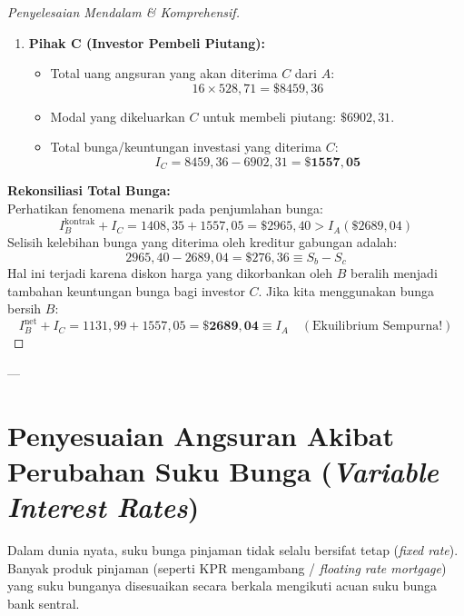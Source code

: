 \documentclass[11pt,a4paper]{article}
\begin{document}
\begin{proof}[Penyelesaian Mendalam \& Komprehensif]
\begin{enumerate}[label=\textbf{\arabic*.}]
    \item \textbf{Pihak C (Investor Pembeli Piutang):}
    \begin{itemize}
        \item Total uang angsuran yang akan diterima $C$ dari $A$:
        \begin{equation*}
            16 \times 528{,}71 = \$8459{,}36
        \end{equation*}
        \item Modal yang dikeluarkan $C$ untuk membeli piutang: $\$6902{,}31$.
        \item Total bunga/keuntungan investasi yang diterima $C$:
        \begin{equation*}
            I_C = 8459{,}36 - 6902{,}31 = \mathbf{\$1557{,}05}
        \end{equation*}
    \end{itemize}
\end{enumerate}

\noindent\textbf{Rekonsiliasi Total Bunga:}\\[0.3em]
Perhatikan fenomena menarik pada penjumlahan bunga:
\begin{equation*}
    I_B^{\text{kontrak}} + I_C = 1408{,}35 + 1557{,}05 = \$2965{,}40 > I_A (\$2689{,}04)
\end{equation*}
Selisih kelebihan bunga yang diterima oleh kreditur gabungan adalah:
\begin{equation*}
    2965{,}40 - 2689{,}04 = \$276{,}36 \equiv S_b - S_c
\end{equation*}
Hal ini terjadi karena diskon harga yang dikorbankan oleh $B$ beralih menjadi tambahan keuntungan bunga bagi investor $C$. Jika kita menggunakan bunga bersih $B$:
\begin{equation*}
    I_B^{\text{net}} + I_C = 1131{,}99 + 1557{,}05 = \mathbf{\$2689{,}04} \equiv I_A \quad (\text{Ekuilibrium Sempurna!})
\end{equation*}
\end{proof}

---

\section{Penyesuaian Angsuran Akibat Perubahan Suku Bunga (\textit{Variable Interest Rates})}

Dalam dunia nyata, suku bunga pinjaman tidak selalu bersifat tetap (\textit{fixed rate}). Banyak produk pinjaman (seperti KPR mengambang / \textit{floating rate mortgage}) yang suku bunganya disesuaikan secara berkala mengikuti acuan suku bunga bank sentral.
\end{document}
